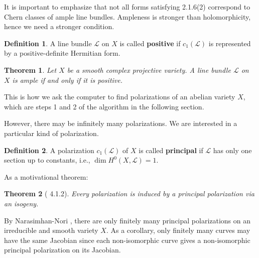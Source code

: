 \documentclass[12pt,reqno]{amsart}
\newcommand{\C}{\mathbb{C}}
\newcommand{\R}{\mathbb{R}}
\newcommand{\mc}{\mathcal}
\newtheorem*{thm*}{Theorem}
\theoremstyle{definition}
\newtheorem{defn}{Definition}
\theoremstyle{remark}
\newtheorem*{remark}{Remark}
\begin{document}
It is important to emphasize that not all forms satisfying 2.1.6(2) correspond to Chern classes of ample line bundles. Ampleness is stronger than holomorphicity, hence we need a stronger condition. 

\begin{defn} 
A line bundle $\mc{L}$ on $X$ is called \textbf{positive} if $c_1(\mc{L})$ is represented by a positive-definite Hermitian form.
\end{defn}

\begin{thm*} 
Let $X$ be a smooth complex projective variety. A line bundle $\mc{L}$ on $X$ is ample if and only if it is positive.
\end{thm*}



This is how we ask the computer to find polarizations of an abelian variety $X$, which are steps 1 and 2 of the algorithm in the following section.

However, there may be infinitely many polarizations. We are interested in a particular kind of polarization.

\begin{defn}  A polarization $c_1(\mc{L})$ of $X$ is called \textbf{principal} if $\mc{L}$ has only one section up to constants, i.e., $\dim H^0(X, \mc{L}) = 1$.  \end{defn} 

As a motivational theorem:

\begin{thm*} [\cite{bl} 4.1.2] Every polarization is induced by a principal polarization via an isogeny. \end{thm*}

By Narasimhan-Nori \cite{nn}, there are only finitely many principal polarizations on an irreducible and smooth variety $X.$ As a corollary, only finitely many curves may have the same Jacobian since each non-isomorphic curve gives a non-isomorphic principal polarization on its Jacobian.
\end{document}
